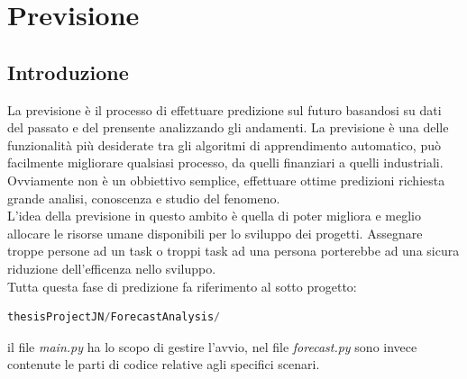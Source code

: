 \documentclass[%
    corpo=12pt,
    twoside,
    oldstyle,
    autoretitolo,
    greek,
    evenboxes,
]{toptesi}
\begin{document}

\chapter{Previsione}
\label{chap:forecasting}
\section{Introduzione}
La previsione è il processo di effettuare predizione sul futuro basandosi su dati del passato e del prensente analizzando gli andamenti. La previsione è una delle funzionalità più desiderate tra gli algoritmi di apprendimento automatico, può facilmente migliorare qualsiasi processo, da quelli finanziari a quelli industriali. Ovviamente non è un obbiettivo semplice, effettuare ottime predizioni richiesta grande analisi, conoscenza e studio del fenomeno.\\
L'idea della previsione in questo ambito è quella di poter migliora e meglio allocare le risorse umane disponibili per lo sviluppo dei progetti. Assegnare troppe persone ad un task o troppi task ad una persona porterebbe ad una sicura riduzione dell'efficenza nello sviluppo.\\
Tutta questa fase di predizione fa riferimento al sotto progetto:
\begin{lstlisting}[language=Python, frame=single, basicstyle=\small]
  thesisProjectJN/ForecastAnalysis/
\end{lstlisting}
il file \textit{main.py} ha lo scopo di gestire l'avvio, nel file \textit{forecast.py} sono invece contenute le parti di codice relative agli specifici scenari.
\end{document}
